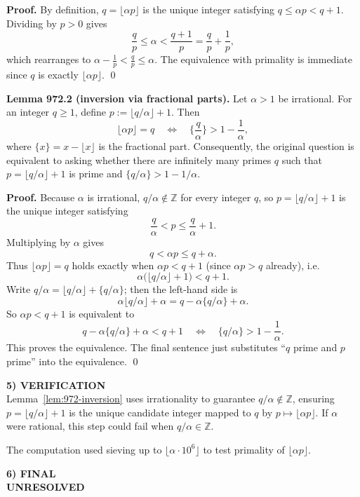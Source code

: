\noindent\textbf{Proof.}
By definition, $q=\lfloor\alpha p\rfloor$ is the unique integer satisfying $q\le \alpha p < q+1$.
Dividing by $p>0$ gives
\[
\frac{q}{p}\le \alpha < \frac{q+1}{p} = \frac{q}{p}+\frac1p,
\]
which rearranges to $\alpha-\frac1p<\frac{q}{p}\le\alpha$.
The equivalence with primality is immediate since $q$ is exactly $\lfloor\alpha p\rfloor$. \qed

\medskip
\noindent\textbf{Lemma 972.2 (inversion via fractional parts).}\label{lem:972-inversion}
Let $\alpha>1$ be irrational.
For an integer $q\ge 1$, define $p:=\lfloor q/\alpha\rfloor+1$.
Then
\[
\lfloor \alpha p\rfloor = q
\quad\Longleftrightarrow\quad
\Big\{\frac{q}{\alpha}\Big\} > 1-\frac{1}{\alpha},
\]
where $\{x\}=x-\lfloor x\rfloor$ is the fractional part.
Consequently, the original question is equivalent to asking whether there are infinitely many primes $q$ such that $p=\lfloor q/\alpha\rfloor+1$ is prime and $\{q/\alpha\}>1-1/\alpha$.

\noindent\textbf{Proof.}
Because $\alpha$ is irrational, $q/\alpha\notin\mathbb{Z}$ for every integer $q$, so $p=\lfloor q/\alpha\rfloor+1$ is the unique integer satisfying
\[
\frac{q}{\alpha}<p\le \frac{q}{\alpha}+1.
\]
Multiplying by $\alpha$ gives
\[
 q< \alpha p\le q+\alpha.
\]
Thus $\lfloor\alpha p\rfloor=q$ holds exactly when $\alpha p<q+1$ (since $\alpha p>q$ already), i.e.
\[
\alpha\Big(\lfloor q/\alpha\rfloor+1\Big) < q+1.
\]
Write $q/\alpha=\lfloor q/\alpha\rfloor+\{q/\alpha\}$; then the left-hand side is
\[
\alpha\lfloor q/\alpha\rfloor+\alpha = q-\alpha\{q/\alpha\}+\alpha.
\]
So $\alpha p<q+1$ is equivalent to
\[
q-\alpha\{q/\alpha\}+\alpha < q+1
\quad\Longleftrightarrow\quad
\{q/\alpha\} > 1-\frac1\alpha.
\]
This proves the equivalence.  The final sentence just substitutes ``$q$ prime and $p$ prime'' into the equivalence. \qed

\medskip
\noindent\textbf{5) VERIFICATION}\\
Lemma~\ref{lem:972-inversion} uses irrationality to guarantee $q/\alpha\notin\mathbb{Z}$, ensuring $p=\lfloor q/\alpha\rfloor+1$ is the unique candidate integer mapped to $q$ by $p\mapsto\lfloor\alpha p\rfloor$.  If $\alpha$ were rational, this step could fail when $q/\alpha\in\mathbb{Z}$.

The computation used sieving up to $\lfloor \alpha\cdot 10^6\rfloor$ to test primality of $\lfloor\alpha p\rfloor$.

\medskip
\noindent\textbf{6) FINAL}\\
\textbf{UNRESOLVED}

